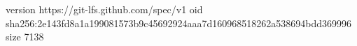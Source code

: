 version https://git-lfs.github.com/spec/v1
oid sha256:2e143fd8a1a199081573b9c45692924aaa7d160968518262a538694bdd369996
size 7138
